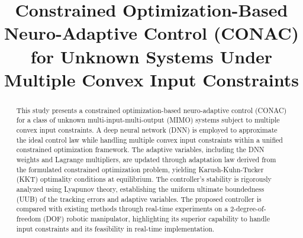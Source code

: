 \documentclass[letterpaper, journal]{IEEEtran}
\newcommand{\version}{0.9.3} %
\begin{document}
\linenumbers
{}

\title{
  Constrained Optimization-Based Neuro-Adaptive Control (CONAC) for Unknown Systems Under Multiple Convex Input Constraints
} %

\author{}
  

%
{}

\maketitle

\begin{abstract}
  This study presents a constrained optimization-based neuro-adaptive control (CONAC) for a class of unknown multi-input-multi-output (MIMO) systems subject to multiple convex input constraints. 
  A deep neural network (DNN) is employed to approximate the ideal control law while handling multiple convex input constraints within a unified constrained optimization framework.
  The adaptive variables, including the DNN weights and Lagrange multipliers, are updated through adaptation law derived from the formulated constrained optimization problem, yielding Karush-Kuhn-Tucker (KKT) optimality conditions at equilibrium.
  The controller's stability is rigorously analyzed using Lyapunov theory, establishing the uniform ultimate boundedness (UUB) of the tracking errors and adaptive variables.
  The proposed controller is compared with existing methods through real-time experiments on a 2-degree-of-freedom (DOF) robotic manipulator, highlighting its superior capability to handle input constraints and its feasibility in real-time implementation.
\end{abstract}
\end{document}
